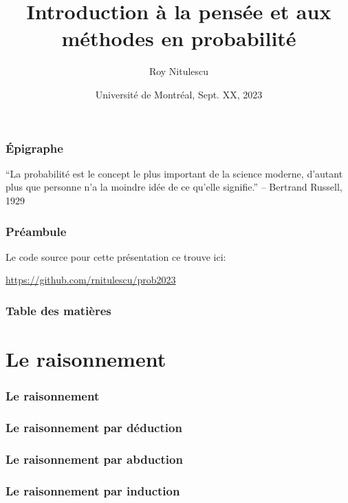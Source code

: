\documentclass{beamer}
\title{Introduction à la pensée et aux méthodes en probabilité}
\author{Roy Nitulescu\inst{1}}
\institute
{
    \inst{1}%
    CITADEL\\
    CR-CHUM
}
\date[UdeM, Sept. XX, 2023]{Université de Montréal, Sept. XX, 2023}
\begin{document}

\frame{\titlepage}

\begin{frame}
    \frametitle{Épigraphe}
    ``La probabilité est le concept le plus important de la science moderne,
    d'autant plus que personne n'a la moindre idée de ce qu'elle signifie.'' -- Bertrand Russell, 1929
\end{frame}


\begin{frame}
    \frametitle{Préambule}
    
    Le code source pour cette présentation ce trouve ici:

    \vfill

    \url{https://github.com/rnitulescu/prob2023}
\end{frame}


\begin{frame}
    \frametitle{Table des matières}
    \tableofcontents
\end{frame}



\section{Le raisonnement}

\begin{frame}
    \frametitle{Le raisonnement}
    
\end{frame}


\begin{frame}
    \frametitle{Le raisonnement par déduction}
    
\end{frame}


\begin{frame}
    \frametitle{Le raisonnement par abduction}
    
\end{frame}


\begin{frame}
    \frametitle{Le raisonnement par induction}
    
\end{frame}
\end{document}
